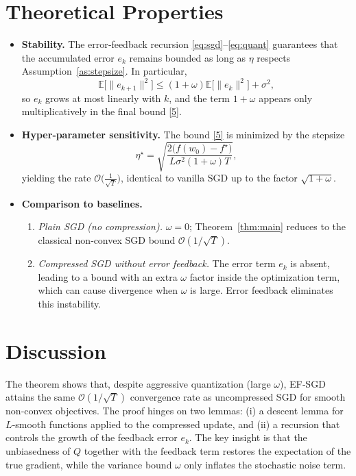 \documentclass{article}
\newcommand{\EE}{\mathbb{E}}
\begin{document}
\section*{Theoretical Properties}
\begin{itemize}
\item \textbf{Stability.} The error‑feedback recursion \eqref{eq:sgd}–\eqref{eq:quant} guarantees that the accumulated error $e_k$ remains bounded as long as $\eta$ respects Assumption~\ref{as:stepsize}.  In particular,
\[
\EE\!\big[\|e_{k+1}\|^{2}\big]\le (1+\omega)\EE\!\big[\|e_k\|^{2}\big]+ \sigma^{2},
\]
so $e_k$ grows at most linearly with $k$, and the term $1+\omega$ appears only multiplicatively in the final bound \eqref{5}.
\item \textbf{Hyper‑parameter sensitivity.} The bound \eqref{5} is minimized by the stepsize
\[
\eta^{\star}= \sqrt{\frac{2\big(f(w_0)-f^{\star}\big)}{L\sigma^{2}(1+\omega)T}},
\]
yielding the rate $\mathcal{O}\!\big(\frac{1}{\sqrt{T}}\big)$, identical to vanilla SGD up to the factor $\sqrt{1+\omega}$.
\item \textbf{Comparison to baselines.}
    \begin{enumerate}[label=\alph*)]
    \item \emph{Plain SGD (no compression).} $\omega=0$; Theorem~\ref{thm:main} reduces to the classical non‑convex SGD bound $\mathcal{O}(1/\sqrt{T})$.
    \item \emph{Compressed SGD without error feedback.} The error term $e_k$ is absent, leading to a bound with an extra $\omega$ factor inside the optimization term, which can cause divergence when $\omega$ is large.  Error feedback eliminates this instability.
    \end{enumerate}
\end{itemize}

\section*{Discussion}
The theorem shows that, despite aggressive quantization (large $\omega$), EF‑SGD attains the same $\mathcal{O}(1/\sqrt{T})$ convergence rate as uncompressed SGD for smooth non‑convex objectives.  The proof hinges on two lemmas: (i) a descent lemma for $L$‑smooth functions applied to the compressed update, and (ii) a recursion that controls the growth of the feedback error $e_k$.  The key insight is that the unbiasedness of $Q$ together with the feedback term restores the expectation of the true gradient, while the variance bound $\omega$ only inflates the stochastic noise term.
\end{document}
